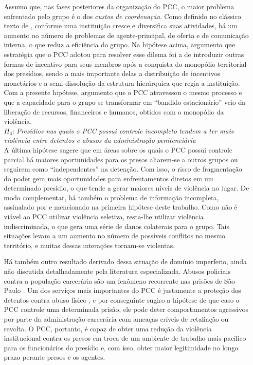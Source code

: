 \documentclass[a4paper,11pt]{article}
\begin{document}
Assumo que, nas fases posteriores da organização do PCC, o maior problema enfrentado pelo grupo é o dos \textit{custos de coordenação}. Como definido no clássico texto de \citet[303]{becker1994division}, conforme uma instituição cresce e diversifica suas atividades, há um aumento no número de problemas de agente-principal, de oferta e de comunicação interna, o que reduz a eficiência do grupo. Na hipótese acima, argumento que estratégia que o PCC adotou para resolver esse dilema foi a de introduzir outras formas de incentivo para seus membros após a conquista do monopólio territorial dos presídios, sendo a mais importante delas a distribuição de incentivos monetários e a semi-dissolução da estrutura hierárquica que regia a instituição. Com a presente hipótese, argumento que o PCC atravessou o mesmo processo e que a capacidade para o grupo se transformar em ``bandido estacionário'' veio da liberação de recursos, financeiros e humanos, obtidos com o monopólio da violência.\\

$H_4$: \textit{Presídios nas quais o PCC possui controle incompleto tendem a ter mais violência entre detentos e abusos da administração penitenciária}\\

A última hipótese sugere que em áreas sobre os quais o PCC possui controle parcial há maiores oportunidades para os presos aliarem-se a outros grupos ou seguirem como ``independentes'' na detenção. Com isso, o risco de fragmentação do poder gera mais oportunidades para enfrentamentos diretos em um determinado presídio, o que tende a gerar maiores níveis de violência no lugar. De modo complementar, há também o problema de informação incompleta, assinalado por \citep{kalyvas2006logic} e mencionado na primeira hipótese deste trabalho. Como não é viável ao PCC utilizar violência seletiva, resta-lhe utilizar violência indiscriminada, o que gera uma série de danos colaterais para o grupo. Tais situações levam a um aumento no número de possíveis conflitos no mesmo território, e muitas dessas interações tornam-se violentas.

Há também outro resultado derivado dessa situação de domínio imperfeito, ainda não discutida detalhadamente pela literatura especializada. Abusos policiais contra a população carcerária são um fenômeno recorrente nas prisões de São Paulo \citep{adorno1998prisoes, assis2008realidade}. Um dos serviços mais importantes do PCC é justamente a proteção dos detentos contra abuso físico \citep{dias2011pulverizaccao}, e por conseguinte sugiro a hipótese de que caso o PCC controle uma determinada prisão, ele pode deter comportamentos agressivos por parte da administração carcerária com ameaças críveis de retaliação ou revolta. O PCC, portanto, é capaz de obter uma redução da violência institucional contra os presos em troca de um ambiente de trabalho mais pacífico para os funcionários do presídio e, com isso, obter maior legitimidade no longo prazo perante presos e os agentes. 
\end{document}
